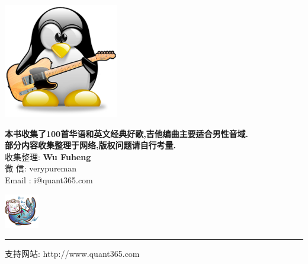 
\begin{center}
\vspace{10mm}
\includegraphics[width=50mm]{me}\\
\vspace{10mm}
\vspace*{3\baselineskip}

\textbf{本书收集了100首华语和英文经典好歌,吉他编曲主要适合男性音域.}\\
\textbf{部分内容收集整理于网络,版权问题请自行考量.}\\


收集整理: \textbf{Wu Fuheng} \\
微    信: verypureman \\
Email   : i@quant365.com


\vspace{5mm}
\includegraphics[width=15mm,height=15mm]{merlion}\\

\end{center}

\vfill
\noindent\rule{6cm}{0.4pt}

支持网站: http://www.quant365.com \\
\pagebreak
